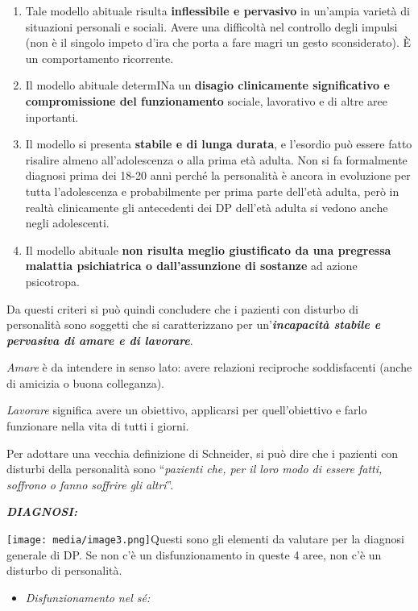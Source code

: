 \documentclass[]{article}
\begin{document}
\begin{enumerate}
\def\labelenumi{\arabic{enumi}.}
\item
  Tale modello abituale risulta \textbf{inflessibile e pervasivo} in
  un'ampia varietà di situazioni personali e sociali. Avere una
  difficoltà nel controllo degli impulsi (non è il singolo impeto d'ira
  che porta a fare magri un gesto sconsiderato). È un comportamento
  ricorrente.
\item
  Il modello abituale determINa un \textbf{disagio clinicamente
  significativo e compromissione del funzionamento} sociale, lavorativo
  e di altre aree inportanti.
\item
  Il modello si presenta \textbf{stabile e di lunga durata}, e l'esordio
  può essere fatto risalire almeno all'adolescenza o alla prima età
  adulta. Non si fa formalmente diagnosi prima dei 18-20 anni perché la
  personalità è ancora in evoluzione per tutta l'adolescenza e
  probabilmente per prima parte dell'età adulta, però in realtà
  clinicamente gli antecedenti dei DP dell'età adulta si vedono anche
  negli adolescenti.
\item
  Il modello abituale \textbf{non risulta meglio giustificato da una
  pregressa malattia psichiatrica o dall'assunzione di sostanze} ad
  azione psicotropa.
\end{enumerate}

Da questi criteri si può quindi concludere che i pazienti con disturbo
di personalità sono soggetti che si caratterizzano per
un'\textbf{\emph{incapacità stabile e pervasiva di amare e di
lavorare}}.

\emph{Amare} è da intendere in senso lato: avere relazioni reciproche
soddisfacenti (anche di amicizia o buona colleganza).

\emph{Lavorare} significa avere un obiettivo, applicarsi per
quell'obiettivo e farlo funzionare nella vita di tutti i giorni.

Per adottare una vecchia definizione di Schneider, si può dire che i
pazienti con disturbi della personalità sono ``\emph{pazienti che, per
il loro modo di essere fatti, soffrono o fanno soffrire gli altri}''.

\textbf{\emph{DIAGNOSI:}}

\texttt{[image: media/image3.png]}Questi
sono gli elementi da valutare per la diagnosi generale di DP. Se non c'è
un disfunzionamento in queste 4 aree, non c'è un disturbo di
personalità.

\begin{itemize}
\item
  \emph{Disfunzionamento nel sé:}
\end{itemize}
\end{document}
